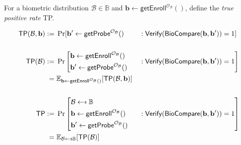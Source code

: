 \begin{definition}
For a biometric distribution $\mathcal{B} \in \mathbb{B}$ and $\mathbf{b} \gets \textsf{getEnroll}^{\mathcal{O}_\mathcal{B}}()$, define the \emph{true positive rate} \textsf{TP}.

\begin{alignat*}{2}
	\textsf{TP}(\mathcal{B}, \mathbf{b}) 
	:=&\; \Pr[ \mathbf{b}^\prime \gets \textsf{getProbe}^{\mathcal{O}_\mathcal{B}}()
	&&: \textsf{Verify}(\textsf{BioCompare}(\mathbf{b}, \mathbf{b}^\prime )) = 1 ] \\
	\\
	\textsf{TP}(\mathcal{B}) 
	:=&\; \Pr \Bigg[ 
		\begin{aligned}	
			& \mathbf{b} \gets \textsf{getEnroll}^{\mathcal{O}_\mathcal{B}}() \\
			& \mathbf{b}^\prime \gets \textsf{getProbe}^{\mathcal{O}_\mathcal{B}}()
		\end{aligned}
		&&: \textsf{Verify}(\textsf{BioCompare}(\mathbf{b}, \mathbf{b}^\prime)) = 1 \Bigg] \\
	=&\; \mathbb{E}_{ \mathbf{b} \gets \textsf{getEnroll}^{\mathcal{O}_\mathcal{B}}() }[\textsf{TP}(\mathcal{B}, \mathbf{b})] \\
	\\
	\textsf{TP} 
	:=&\; \Pr \vast[
		\begin{aligned}
			& \mathcal{B} \getsdollar \mathbb{B} \\
			& \mathbf{b} \gets \textsf{getEnroll}^{\mathcal{O}_\mathcal{B} }() \\
			& \mathbf{b}^\prime \gets \textsf{getProbe}^{\mathcal{O}_\mathcal{B} }()
		\end{aligned}
		&&: \textsf{Verify}(\textsf{BioCompare}(\mathbf{b}, \mathbf{b}^\prime )) = 1 \vast] \\
	=&\; \mathbb{E}_{\mathcal{B} \getsdollar \mathbb{B}}[\textsf{TP}(\mathcal{B})] 
\end{alignat*}

\end{definition}


